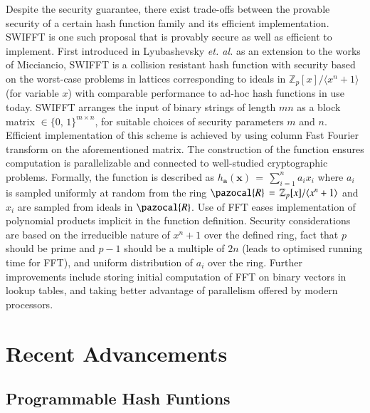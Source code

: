 \documentclass[10pt]{elsarticle}
\begin{document}
Despite the security guarantee, there exist trade-offs between the provable security of a certain hash function family and its efficient implementation. SWIFFT is one such proposal that is provably secure as well as efficient to implement. First introduced in Lyubashevsky \textit{et. al.}\cite{CRHF_Rosen2008} as an extension to the works of Micciancio\cite{CRHF_Micciancio2002_compact_knapsacks}, SWIFFT is a collision resistant hash function with security based on the worst-case problems in lattices corresponding to ideals in $\mathbb{Z}_{p}[x]/\langle x^{n} + 1 \rangle$ (for variable $x$) with comparable performance to ad-hoc hash functions in use today. SWIFFT arranges the input of binary strings of length $mn$ as a block matrix $\in \{ 0,\, 1\}^{m \times n}$, for suitable choices of security parameters $m$ and $n$. Efficient implementation of this scheme is achieved by using column Fast Fourier transform on the aforementioned matrix. The construction of the function ensures computation is parallelizable and connected to well-studied cryptographic problems. Formally, the function is described as $h_{\mathbf{a}}(\mathbf{x})\, = \, \sum_{i=1}^{n} a_{i}x_{i}$ where $a_{i}$ is sampled uniformly at random from the ring $\pazocal{R} \, = \,\mathbb{Z}_{p}[x]/\langle x^{n} + 1 \rangle$ and $x_{i}$ are sampled from ideals in $\pazocal{R}$. Use of FFT eases implementation of polynomial products implicit in the function definition. Security considerations are based on the irreducible nature of $x^{n} + 1$ over the defined ring, fact that $p$ should be prime and $p - 1$ should be a multiple of $2n$ (leads to optimised running time for FFT), and uniform distribution of $a_{i}$ over the ring. Further improvements include storing initial computation of FFT on binary vectors in lookup tables, and taking better advantage of parallelism offered by modern processors.


\section{Recent Advancements}

\subsection{Programmable Hash Funtions}
\end{document}
